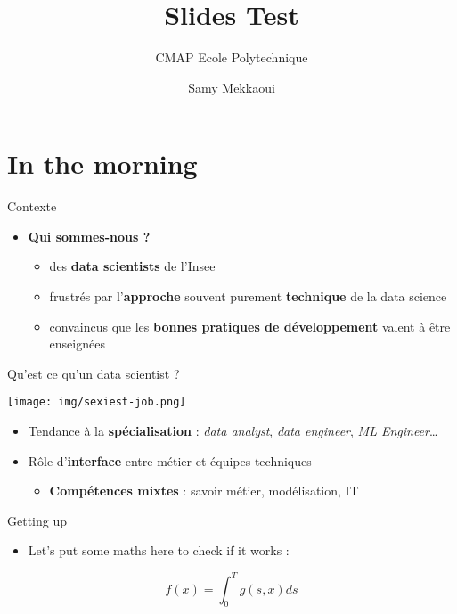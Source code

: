 \documentclass[
  ignorenonframetext,
]{beamer}
\title{Slides Test}
\subtitle{CMAP Ecole Polytechnique}
\author{Samy Mekkaoui}
\date{}
\providecommand{\tightlist}{%
  \setlength{\itemsep}{0pt}\setlength{\parskip}{0pt}}\usepackage{longtable,booktabs,array}
\begin{document}
\frame{\titlepage}


\section{In the morning}\label{in-the-morning}

\begin{frame}{Contexte}
\label{contexte}
\begin{itemize}[<+->]
\tightlist
\item
  {\textbf{Qui sommes-nous ?}}

  \begin{itemize}[<+->]
  \tightlist
  \item
    des {\textbf{data scientists}} de l'Insee
  \item
    frustrés par l'{\textbf{approche}} souvent purement
    {\textbf{technique}} de la data science
  \item
    convaincus que les {\textbf{bonnes pratiques de développement}}
    valent à être enseignées
  \end{itemize}
\end{itemize}
\end{frame}

\begin{frame}{Qu'est ce qu'un data scientist ?}
\label{quest-ce-quun-data-scientist}
\begin{center}
\texttt{[image: img/sexiest-job.png]}
\end{center}

\begin{itemize}[<+->]
\item
  Tendance à la {\textbf{spécialisation}} : \emph{data analyst},
  \emph{data engineer}, \emph{ML Engineer}\ldots{}
\item
  Rôle d'{\textbf{interface}} entre métier et équipes techniques

  \begin{itemize}[<+->]
  \tightlist
  \item
    {\textbf{Compétences mixtes}} : savoir métier, modélisation, IT
  \end{itemize}
\end{itemize}
\end{frame}

\begin{frame}{Getting up}
\label{getting-up}
\begin{itemize}[<+->]
\tightlist
\item
  Let's put some maths here to check if it works :
\end{itemize}

\[
f(x) = \int_{0}^{T} g(s,x) ds
\]
\end{frame}
\end{document}
